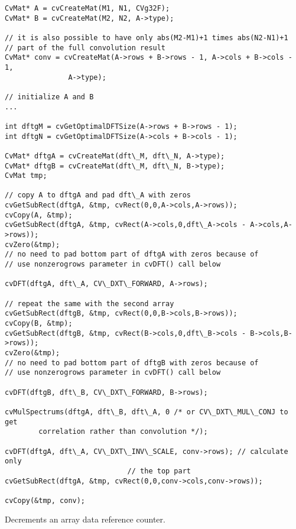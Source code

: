 \ifC
\begin{lstlisting}
CvMat* A = cvCreateMat(M1, N1, CVg32F);
CvMat* B = cvCreateMat(M2, N2, A->type);

// it is also possible to have only abs(M2-M1)+1 times abs(N2-N1)+1
// part of the full convolution result
CvMat* conv = cvCreateMat(A->rows + B->rows - 1, A->cols + B->cols - 1, 
			   A->type);

// initialize A and B
...

int dftgM = cvGetOptimalDFTSize(A->rows + B->rows - 1);
int dftgN = cvGetOptimalDFTSize(A->cols + B->cols - 1);

CvMat* dftgA = cvCreateMat(dft\_M, dft\_N, A->type);
CvMat* dftgB = cvCreateMat(dft\_M, dft\_N, B->type);
CvMat tmp;

// copy A to dftgA and pad dft\_A with zeros
cvGetSubRect(dftgA, &tmp, cvRect(0,0,A->cols,A->rows));
cvCopy(A, &tmp);
cvGetSubRect(dftgA, &tmp, cvRect(A->cols,0,dft\_A->cols - A->cols,A->rows));
cvZero(&tmp);
// no need to pad bottom part of dftgA with zeros because of
// use nonzerogrows parameter in cvDFT() call below

cvDFT(dftgA, dft\_A, CV\_DXT\_FORWARD, A->rows);

// repeat the same with the second array
cvGetSubRect(dftgB, &tmp, cvRect(0,0,B->cols,B->rows));
cvCopy(B, &tmp);
cvGetSubRect(dftgB, &tmp, cvRect(B->cols,0,dft\_B->cols - B->cols,B->rows));
cvZero(&tmp);
// no need to pad bottom part of dftgB with zeros because of
// use nonzerogrows parameter in cvDFT() call below

cvDFT(dftgB, dft\_B, CV\_DXT\_FORWARD, B->rows);

cvMulSpectrums(dftgA, dft\_B, dft\_A, 0 /* or CV\_DXT\_MUL\_CONJ to get 
		correlation rather than convolution */);

cvDFT(dftgA, dft\_A, CV\_DXT\_INV\_SCALE, conv->rows); // calculate only 
							 // the top part
cvGetSubRect(dftgA, &tmp, cvRect(0,0,conv->cols,conv->rows));

cvCopy(&tmp, conv);
\end{lstlisting}
\fi

\ifC

Decrements an array data reference counter.


\begin{description}
\end{description}

